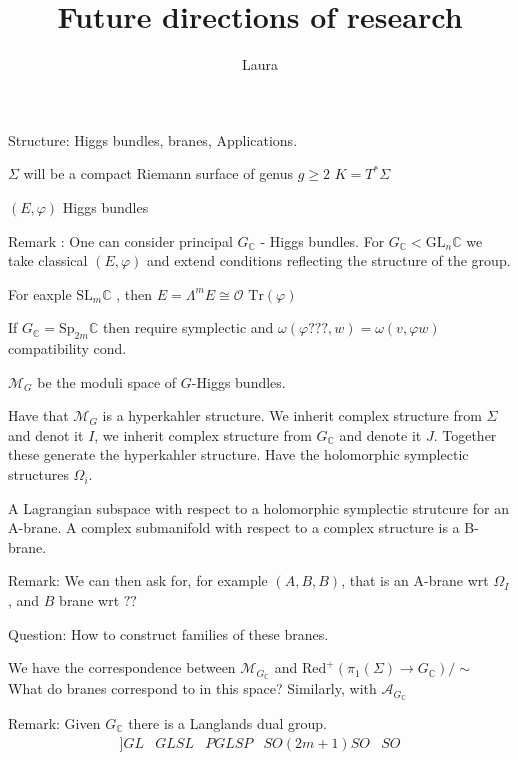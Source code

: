 % 



\title{Future directions of research}
\author{Laura}
\date{}

 
\maketitle

Structure: Higgs bundles, branes, Applications. 

$\Sigma$ will be a compact Riemann surface of genus $g \geq 2$ 
$K = T^* \Sigma$


$(E, \varphi)$ Higgs bundles 


Remark : 
One can consider principal $G_\mathbb{C} $ - Higgs bundles.
For $ G_\mathbb{C} < \mathrm{GL}_n \mathbb{C} $ we take classical $(E, \varphi)$ and extend 
conditions reflecting the structure of the group.

For eaxple $ \mathrm{SL}_m \mathbb{C}  $ , then $E = \Lambda^m E \cong \mathcal{O} $ 
$ \mathrm{Tr} (\varphi) $ 

If $ G_\mathbb{C}  = \mathrm{Sp}_{2m} \mathbb{C}  $ then require symplectic 
and $ \omega ( \varphi ???, w)  = \omega ( v, \varphi w) $ compatibility cond. 

$\mathcal{M} _{G} $ be the moduli space of $ G$-Higgs bundles. 

Have that $ \mathcal{M} _G $ is a hyperkahler structure.
We inherit complex structure from $\Sigma$ and denot it $I$,
we inherit complex structure from $ G_\mathbb{C} $ and denote it $J$. 
Together these generate the hyperkahler structure. 
Have the holomorphic symplectic structures $\Omega _i $. 

A Lagrangian subspace with respect to a holomorphic symplectic strutcure for an A-brane. 
A complex submanifold with respect to a complex structure is a B-brane.

Remark: We can then ask for, for example $(A, B, B)$, that is an A-brane wrt $\Omega_I$, and $B$ brane wrt $??$

Question: How to construct families of these branes.

We have the correspondence between $ \mathcal{M} _{G_\mathbb{C}  } $ and $\mathrm{Red} ^+ (\pi_1 (\Sigma) \rightarrow G_\mathbb{C} ) / \sim $ 
What do branes correspond to in this space?
Similarly, with $ \mathcal{A}_{G_\mathbb{C} } $ 

Remark: 
Given $ G_\mathbb{C}  $ there is a Langlands dual group. 
\begin{align}
    [[LIST OF DUAL GROUPS ]]
    GL & GL 
    SL & PGL 
    SP & SO (2m+1 ) 
    SO & SO 
\end{align}


